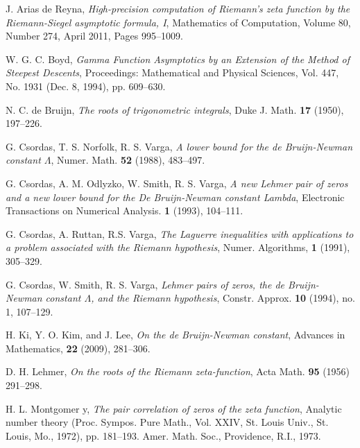 \documentclass[a4paper,11pt,twoside]{amsart}
\begin{document}
\begin{thebibliography}{99} 

J. Arias de Reyna, \emph{High-precision computation of Riemann's zeta function by the Riemann-Siegel asymptotic formula, I}, Mathematics of Computation, Volume 80, Number 274, April 2011, Pages 995–1009.

W. G. C. Boyd, \emph{Gamma Function Asymptotics by an Extension of the Method of Steepest Descents}, Proceedings: Mathematical and Physical Sciences, Vol. 447, No. 1931 (Dec. 8, 1994), pp. 609--630.

N. C. de Bruijn, \emph{The roots of trigonometric integrals}, Duke J. Math. \textbf{17} (1950), 197--226.

%

G. Csordas, T. S. Norfolk, R. S. Varga, \emph{A lower bound for the de Bruijn-Newman constant $\Lambda$}, Numer. Math. \textbf{52} (1988), 483--497.

G. Csordas, A. M. Odlyzko, W. Smith, R. S. Varga, \emph{A new Lehmer pair of zeros and a new lower bound for the De Bruijn-Newman constant Lambda}, Electronic Transactions on Numerical Analysis. \textbf{1} (1993), 104--111.

G. Csordas, A. Ruttan, R.S. Varga, \emph{The Laguerre inequalities with applications
to a problem associated with the Riemann hypothesis}, Numer. Algorithms, \textbf{1} (1991), 305--329.

G. Csordas, W. Smith, R. S. Varga, \emph{Lehmer pairs of zeros, the de Bruijn-Newman constant $\Lambda$, and the Riemann hypothesis},  Constr. Approx. \textbf{10} (1994), no. 1, 107--129. 

H. Ki, Y. O. Kim, and J. Lee, \emph{On the de Bruijn-Newman constant}, Advances in Mathematics, \textbf{22} (2009), 281--306.

D. H. Lehmer, \emph{On the roots of the Riemann zeta-function}, Acta Math. \textbf{95} (1956) 291--298.

H. L. Montgomer
y, \emph{The pair correlation of zeros of the zeta function}, Analytic number theory (Proc. Sympos. Pure Math., Vol. XXIV, St. Louis Univ., St. Louis, Mo., 1972), pp. 181--193. Amer. Math. Soc., Providence, R.I., 1973.


\end{thebibliography}
\end{document}
